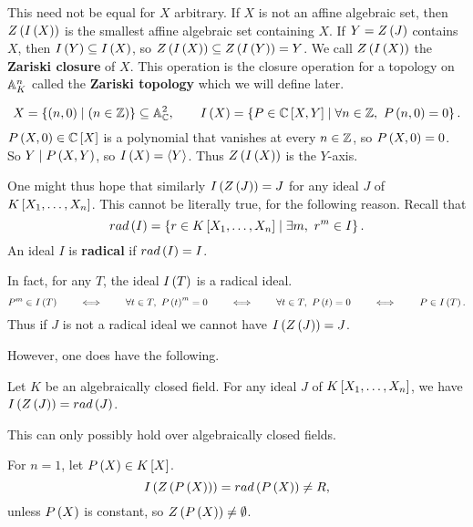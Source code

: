 This need not be equal for $ X $ arbitrary. If $ X $ is not an affine algebraic set, then $ Z\rb{I\rb{X}} $ is the smallest affine algebraic set containing $ X $. If $ Y = Z\rb{J} $ contains $ X $, then $ I\rb{Y} \subseteq I\rb{X} $, so $ Z\rb{I\rb{X}} \subseteq Z\rb{I\rb{Y}} = Y $. We call $ Z\rb{I\rb{X}} $ the \textbf{Zariski closure} of $ X $. This operation is the closure operation for a topology on $ \A_K^n $ called the \textbf{Zariski topology} which we will define later.

\begin{example*}
$$ X = \cb{\rb{n, 0} \mid \rb{n \in \Z}} \subseteq \A_\C^2, \qquad I\rb{X} = \cb{P \in \C\sb{X, Y} \mid \forall n \in \Z, \ P\rb{n, 0} = 0}. $$
$ P\rb{X, 0} \in \C\sb{X} $ is a polynomial that vanishes at every $ n \in \Z $, so $ P\rb{X, 0} = 0 $. So $ Y \mid P\rb{X, Y} $, so $ I\rb{X} = \ab{Y} $. Thus $ Z\rb{I\rb{X}} $ is the $ Y $-axis.
\end{example*}

\pagebreak

One might thus hope that similarly $ I\rb{Z\rb{J}} = J $ for any ideal $ J $ of $ K\sb{X_1, \dots, X_n} $. This cannot be literally true, for the following reason. Recall that
$$ rad\rb{I} = \cb{r \in K\sb{X_1, \dots, X_n} \mid \exists m, \ r^m \in I}. $$
An ideal $ I $ is \textbf{radical} if $ rad\rb{I} = I $.

\begin{note*}
In fact, for any $ T $, the ideal $ I\rb{T} $ is a radical ideal.
$$ P^m \in I\rb{T} \qquad \iff \qquad \forall t \in T, \ P\rb{t}^m = 0 \qquad \iff \qquad \forall t \in T, \ P\rb{t} = 0 \qquad \iff \qquad P \in I\rb{T}. $$
Thus if $ J $ is not a radical ideal we cannot have $ I\rb{Z\rb{J}} = J $.
\end{note*}

However, one does have the following.

\begin{theorem}
\label{thm:13.2.5}
Let $ K $ be an algebraically closed field. For any ideal $ J $ of $ K\sb{X_1, \dots, X_n} $, we have $ I\rb{Z\rb{J}} = rad\rb{J} $.
\end{theorem}

\begin{note*}
This can only possibly hold over algebraically closed fields.
\end{note*}

\begin{example*}
For $ n = 1 $, let $ P\rb{X} \in K\sb{X} $.
$$ I\rb{Z\rb{P\rb{X}}} = rad\rb{P\rb{X}} \ne R, $$
unless $ P\rb{X} $ is constant, so $ Z\rb{P\rb{X}} \ne \emptyset $.
\end{example*}

